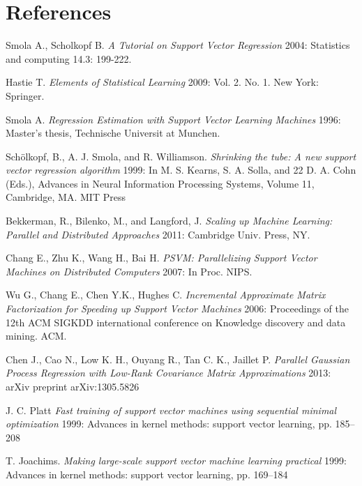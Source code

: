 \documentclass[12pt]{article}
\begin{document}
\section{References}
\renewcommand{\section}[2]{}%
 \begin{thebibliography}{}
 
  Smola A.,  Scholkopf B. {\em A Tutorial on Support Vector Regression} 2004:  Statistics and computing 14.3: 199-222.
  
 Hastie T. {\em Elements of Statistical Learning} 2009:  Vol. 2. No. 1. New York: Springer.
    
 Smola A. {\em Regression
Estimation with Support Vector Learning Machines} 1996: Master's thesis, Technische Universit at Munchen.


Sch\"olkopf, B., A. J. Smola, and R. Williamson. {\em Shrinking the tube: A new support vector regression algorithm} 1999: In M. S. Kearns, S. A. Solla, and 22 D. A. Cohn (Eds.), Advances in Neural Information Processing Systems, Volume 11, Cambridge, MA. MIT Press

\bibitem{}Bekkerman, R., Bilenko, M., and Langford, J. {\em Scaling up Machine Learning: Parallel and Distributed Approaches} 2011: Cambridge Univ. Press, NY.

 Chang E., Zhu K., Wang H., Bai H.  {\em PSVM: Parallelizing Support Vector Machines on Distributed Computers} 2007: In Proc. NIPS.
 
  Wu G., Chang E., Chen Y.K., Hughes C.  {\em Incremental Approximate Matrix Factorization for Speeding up Support Vector Machines} 2006: Proceedings of the 12th ACM SIGKDD international conference on Knowledge discovery and data mining. ACM.

  Chen J., Cao N., Low K. H.,  Ouyang R., Tan C. K., Jaillet P.  {\em Parallel Gaussian Process Regression with Low-Rank Covariance Matrix Approximations} 2013: arXiv preprint arXiv:1305.5826
 
J. C. Platt {\em Fast training of support vector machines using sequential minimal optimization} 1999: Advances in kernel methods: support vector learning, pp. 185–208

T. Joachims. {\em Making large-scale support vector machine learning practical} 1999: Advances in kernel methods: support vector learning, pp. 169–184


\end{thebibliography}
\end{document}
